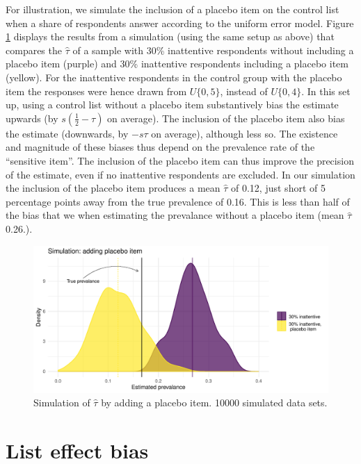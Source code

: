 \documentclass[]{article}
\begin{document}
For illustration, we simulate the inclusion of a placebo item on the
control list when a share of respondents answer according to the uniform
error model. Figure \ref{placebo_simulation} displays the results from a
simulation (using the same setup as above) that compares the
\(\hat{\tau}\) of a sample with 30\% inattentive respondents without
including a placebo item (purple) and 30\% inattentive respondents
including a placebo item (yellow). For the inattentive respondents in
the control group with the placebo item the responses were hence drawn
from \(U\{0,5\}\), instead of \(U\{0,4\}\). In this set up, using a
control list without a placebo item substantively bias the estimate
upwards (by \(s \left(\frac{1}{2} - \tau \right)\) on average). The
inclusion of the placebo item also bias the estimate (downwards, by
\(-s \tau\) on average), although less so. The existence and magnitude
of these biases thus depend on the prevalence rate of the ``sensitive
item''. The inclusion of the placebo item can thus improve the precision
of the estimate, even if no inattentive respondents are excluded. In our
simulation the inclusion of the placebo item produces a mean
\(\hat{\tau}\) of 0.12, just short of 5 percentage points away from the
true prevalence of 0.16. This is less than half of the bias that we when
estimating the prevalance without a placebo item (mean \(\hat{\tau}\)
0.26.).

\begin{figure}
\centering
\includegraphics[width=6.25in,height=\textheight]{output/estimates_placebo_color.pdf}
\caption{Simulation of \(\hat{\tau}\) by adding a placebo item. 10000
simulated data sets. \label{placebo_simulation}}
\end{figure}

\hypertarget{list-effect-bias}{%
\section{List effect bias}\label{list-effect-bias}}
\end{document}
